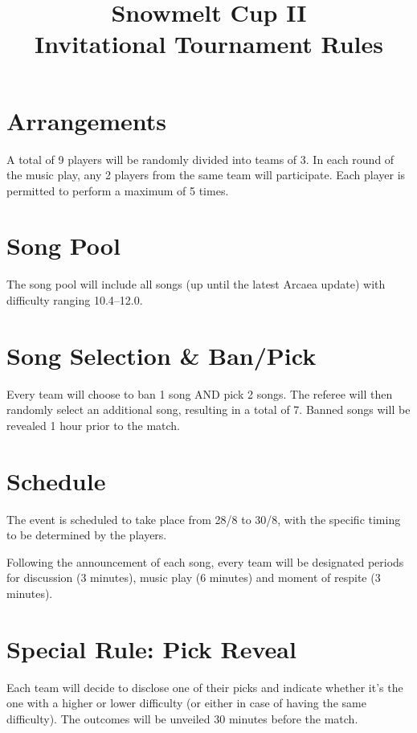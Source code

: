 \documentclass{article}
\title{{Snowmelt Cup II}\\{\Huge Invitational Tournament Rules}}
\date{}
\begin{document}
\maketitle
{}
\frenchspacing

\section{Arrangements}

A total of 9 players will be randomly divided into teams of 3.
In each round of the music play, any 2 players from the same team will participate.
Each player is permitted to perform a maximum of 5 times.


\section{Song Pool}

The song pool will include all songs
(up until the latest Arcaea update)
with difficulty ranging 10.4--12.0.


\section{Song Selection \& Ban/Pick}

Every team will choose to ban 1 song AND pick 2 songs. The referee will then
randomly select an additional song, resulting in a total of 7.
Banned songs will be revealed 1 hour prior to the match.


\section{Schedule}

The event is scheduled to take place from 28/8 to 30/8, with the
specific timing to be determined by the players.

Following the announcement of each song, every team will be designated
periods for discussion (3 minutes), music play (6 minutes) and moment of
respite (3 minutes).


\section{Special Rule: Pick Reveal}

Each team will decide to disclose one of their picks and
indicate whether it's the one with a higher or lower difficulty
(or either in case of having the same difficulty).
The outcomes will be unveiled 30 minutes before the match.
\end{document}
